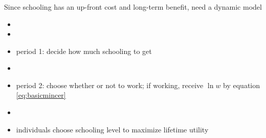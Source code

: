 \documentclass[aspectratio=169]{beamer}
\begin{document}
\begin{frame}\frametitle{}

Since schooling has an up-front cost and long-term benefit, need a dynamic model

\begin{itemize}
    \item[]
    \item[]
    \item period 1: decide how much schooling to get
    \item[]
    \item period 2: choose whether or not to work; if working, receive $\ln w$ by equation \eqref{eq:basicmincer}
    \item[]
    \item individuals choose schooling level to maximize lifetime utility
\end{itemize}
\end{frame}






\end{document}
